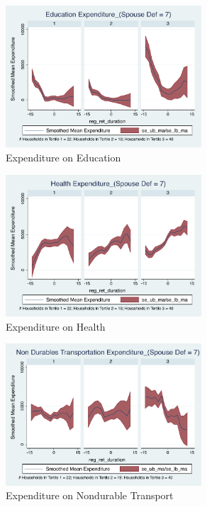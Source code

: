 \documentclass[11pt,onecolumn]{article}
\numberwithin{figure}{section}
\begin{document}
\begin{figure}[h]
	\caption{Expenditure on Education}
	\centering
	\includegraphics[width=0.65\textwidth]{../ConsumptionPostRetirement_by_SpouseDef_Cats/Smoothed/7/spouse_def_total_education_real.pdf}
\end{figure}
\clearpage

\begin{figure}[h]
	\caption{Expenditure on Health}
	\centering
	\includegraphics[width=0.65\textwidth]{../ConsumptionPostRetirement_by_SpouseDef_Cats/Smoothed/7/spouse_def_total_healthexpense_real.pdf}
\end{figure}


\begin{figure}[h]
	\caption{Expenditure on Nondurable Transport}
	\centering
	\includegraphics[width=0.65\textwidth]{../ConsumptionPostRetirement_by_SpouseDef_Cats/Smoothed/7/spouse_def_total_transport_real.pdf}
\end{figure}
\clearpage
\end{document}
